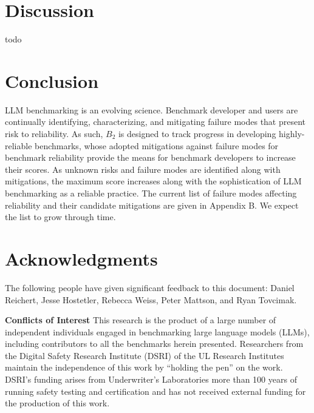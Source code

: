 \documentclass{article}
\newcommand\bb{$B_2$ }
\begin{document}
\section{Discussion}
todo

\section{Conclusion}

LLM benchmarking is an evolving science. Benchmark developer and users are continually identifying, characterizing, and mitigating failure modes that present risk to reliability. As such, \bb is designed to track progress in developing highly-reliable benchmarks, whose adopted mitigations against failure modes for benchmark reliability provide the means for benchmark developers to increase their scores. As unknown risks and failure modes are identified along with mitigations, the maximum score increases along with the sophistication of LLM benchmarking as a reliable practice. The current list of failure modes affecting reliability and their candidate mitigations are given in Appendix B. We expect the list to grow through time.

\section{Acknowledgments}
The following people have given significant feedback to this document: Daniel Reichert, Jesse Hostetler, Rebecca Weiss, Peter Mattson, and Ryan Tovcimak.

\begin{center}
    \begin{tcolorbox}[colback=blue!10, colframe=blue!50, width=\textwidth, boxrule=0.5mm, sharp corners, coltext=black, halign=left]
        \textbf{Conflicts of Interest}
This research is the product of a large number of independent individuals engaged in benchmarking large language models (LLMs), including contributors to all the benchmarks herein presented. Researchers from the Digital Safety Research Institute (DSRI) of the UL Research Institutes maintain the independence of this work by ``holding the pen'' on the work. DSRI's funding arises from Underwriter's Laboratories more than 100 years of running safety testing and certification and has not received external funding for the production of this work.
\end{tcolorbox}
\end{center}





\appendix 





\end{document}

